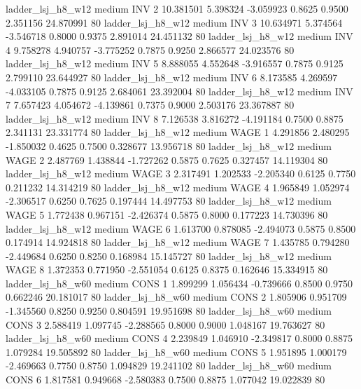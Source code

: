      ladder_lsj_h8_w12     medium      INV                 2 10.381501 5.398324 -3.059923 0.8625 0.9500  2.351156   24.870991 80
     ladder_lsj_h8_w12     medium      INV                 3 10.634971 5.374564 -3.546718 0.8000 0.9375  2.891014   24.451132 80
     ladder_lsj_h8_w12     medium      INV                 4  9.758278 4.940757 -3.775252 0.7875 0.9250  2.866577   24.023576 80
     ladder_lsj_h8_w12     medium      INV                 5  8.888055 4.552648 -3.916557 0.7875 0.9125  2.799110   23.644927 80
     ladder_lsj_h8_w12     medium      INV                 6  8.173585 4.269597 -4.033105 0.7875 0.9125  2.684061   23.392004 80
     ladder_lsj_h8_w12     medium      INV                 7  7.657423 4.054672 -4.139861 0.7375 0.9000  2.503176   23.367887 80
     ladder_lsj_h8_w12     medium      INV                 8  7.126538 3.816272 -4.191184 0.7500 0.8875  2.341131   23.331774 80
     ladder_lsj_h8_w12     medium     WAGE                 1  4.291856 2.480295 -1.850032 0.4625 0.7500  0.328677   13.956718 80
     ladder_lsj_h8_w12     medium     WAGE                 2  2.487769 1.438844 -1.727262 0.5875 0.7625  0.327457   14.119304 80
     ladder_lsj_h8_w12     medium     WAGE                 3  2.317491 1.202533 -2.205340 0.6125 0.7750  0.211232   14.314219 80
     ladder_lsj_h8_w12     medium     WAGE                 4  1.965849 1.052974 -2.306517 0.6250 0.7625  0.197444   14.497753 80
     ladder_lsj_h8_w12     medium     WAGE                 5  1.772438 0.967151 -2.426374 0.5875 0.8000  0.177223   14.730396 80
     ladder_lsj_h8_w12     medium     WAGE                 6  1.613700 0.878085 -2.494073 0.5875 0.8500  0.174914   14.924818 80
     ladder_lsj_h8_w12     medium     WAGE                 7  1.435785 0.794280 -2.449684 0.6250 0.8250  0.168984   15.145727 80
     ladder_lsj_h8_w12     medium     WAGE                 8  1.372353 0.771950 -2.551054 0.6125 0.8375  0.162646   15.334915 80
     ladder_lsj_h8_w60     medium     CONS                 1  1.899299 1.056434 -0.739666 0.8500 0.9750  0.662246   20.181017 80
     ladder_lsj_h8_w60     medium     CONS                 2  1.805906 0.951709 -1.345560 0.8250 0.9250  0.804591   19.951698 80
     ladder_lsj_h8_w60     medium     CONS                 3  2.588419 1.097745 -2.288565 0.8000 0.9000  1.048167   19.763627 80
     ladder_lsj_h8_w60     medium     CONS                 4  2.239849 1.046910 -2.349817 0.8000 0.8875  1.079284   19.505892 80
     ladder_lsj_h8_w60     medium     CONS                 5  1.951895 1.000179 -2.469663 0.7750 0.8750  1.094829   19.241102 80
     ladder_lsj_h8_w60     medium     CONS                 6  1.817581 0.949668 -2.580383 0.7500 0.8875  1.077042   19.022839 80
